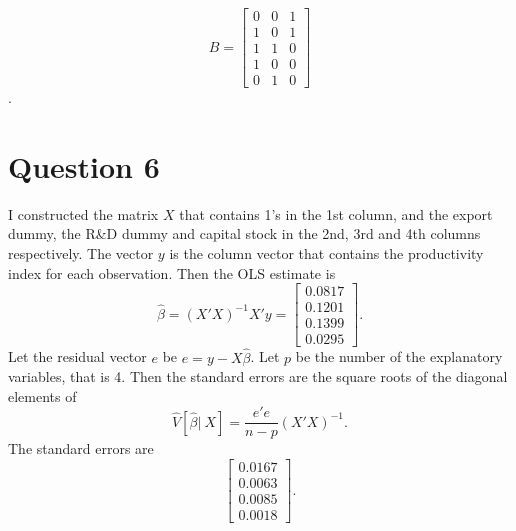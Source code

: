 \documentclass[12pt]{article}
\begin{document}
$$
B=\left[
\begin{array}{rrr}
   0&   0&   1\\
   1 &  0&   1\\
   1 &  1&   0\\
   1 &  0 &  0\\
   0 &1& 0
\end{array}
\right]
$$.

\section{Question 6}
I constructed the matrix $X$ that contains 1's in the 1st column, and the export dummy, the R\&D dummy and capital stock in the 2nd, 3rd and 4th columns respectively. The vector $y$ is the column vector that contains the productivity index for each observation. Then the OLS estimate is
$$
\hat{\beta}=(X'X)^{-1}X'y=\left[
\begin{array}{r}
    0.0817\\
    0.1201\\
    0.1399\\
0.0295
\end{array}
\right].
$$
Let the residual vector $e$ be $e=y-X\hat{\beta}$. Let $p$ be the number of the explanatory variables, that is 4. Then the standard errors are the square roots of the diagonal elements of
$$
\hat{V}[\hat{\beta}|\ X]=\frac{e'e}{n-p}(X'X)^{-1}.
$$
The standard errors are
$$
\left[
\begin{array}{r}
    0.0167\\
    0.0063\\
    0.0085\\
0.0018
\end{array}
\right].
$$
\end{document}

